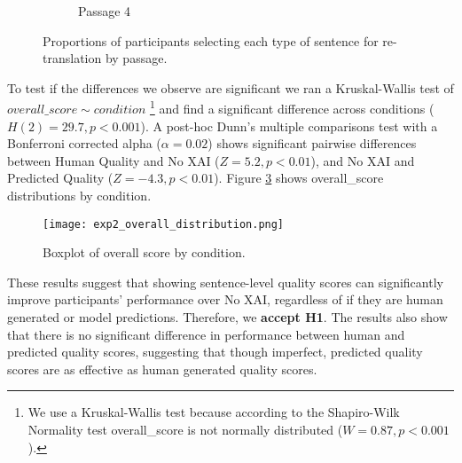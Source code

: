 \begin{figure}
\begin{subfigure}[t]{0.45\textwidth}
{\begin{bchart}[step=.25,max=1,width=\linewidth]
        \bcskip{6pt}
        
        
        \end{bchart}}
        \caption{Passage 4} 
        \label{fig:exp_p4_prop_answers}
    \end{subfigure}
    
    \caption{Proportions of participants selecting each type of sentence for re-translation by passage.}
    \label{fig:exp_prop_answers}

\end{figure}

To test if the differences we observe are significant we ran a Kruskal-Wallis test of $overall\_score \sim condition$ \footnote{We use a Kruskal-Wallis test because according to the Shapiro-Wilk Normality test overall\_score is not normally distributed ($W = 0.87, p < 0.001$).} and find a significant difference across conditions ($H(2) = 29.7, p < 0.001$). A post-hoc Dunn’s multiple comparisons test with a Bonferroni corrected alpha ($\alpha = 0.02$) shows significant pairwise differences between Human Quality and No XAI ($Z = 5.2, p < 0.01$), and No XAI and Predicted Quality ($Z = -4.3, p < 0.01$). Figure \ref{fig:exp_overall_distribution} shows overall\_score distributions by condition. 

\begin{figure}[h!]
    \centering
    \texttt{[image: exp2\_overall\_distribution.png]}
    \caption{Boxplot of overall score by condition.}
    \label{fig:exp_overall_distribution}
\end{figure}

These results suggest that showing sentence-level quality scores can significantly improve participants’ performance over No XAI, regardless of if they are human generated or model predictions. Therefore, we \textbf{accept H1}. The results also show that there is no significant difference in performance between human and predicted quality scores, suggesting that though imperfect, predicted quality scores are as effective as human generated quality scores. 

